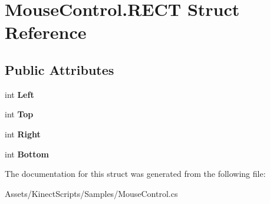 \hypertarget{struct_mouse_control_1_1_r_e_c_t}{}\section{Mouse\+Control.\+R\+E\+CT Struct Reference}
\label{struct_mouse_control_1_1_r_e_c_t}
\subsection*{Public Attributes}
\begin{DoxyCompactItemize}
\item 
\mbox{\label{struct_mouse_control_1_1_r_e_c_t_a1aefdeec1cb3bd1222eaeb04713c5676}} 
int {\bfseries Left}
\item 
\mbox{\label{struct_mouse_control_1_1_r_e_c_t_a4f04a41b690fb8ca774c271deff0033b}} 
int {\bfseries Top}
\item 
\mbox{\label{struct_mouse_control_1_1_r_e_c_t_a46b31f875cda8c248915e845398f83a1}} 
int {\bfseries Right}
\item 
\mbox{\label{struct_mouse_control_1_1_r_e_c_t_a9a02216ee37790780949c85821fe69fe}} 
int {\bfseries Bottom}
\end{DoxyCompactItemize}


The documentation for this struct was generated from the following file\+:\begin{DoxyCompactItemize}
\item 
Assets/\+Kinect\+Scripts/\+Samples/Mouse\+Control.\+cs\end{DoxyCompactItemize}
